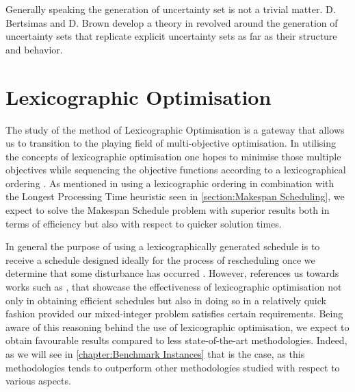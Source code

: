 \vspace{\baselineskip}
\noindent
Generally speaking the generation of uncertainty set is not a trivial matter. D. Bertsimas and D. Brown develop a theory in \cite{concstructuncertaity} revolved around the generation of uncertainty sets that replicate explicit uncertainty sets as far as their structure and behavior. 

\section{Lexicographic Optimisation}
\label{section: Lexicographic}
The study of the method of Lexicographic Optimisation is a gateway that allows us to transition to the playing field of multi-objective optimisation. In utilising the concepts of lexicographic optimisation one hopes to minimise those multiple objectives while sequencing the objective functions according to a lexicographical ordering \cite{surajg}. As mentioned in \cite{DBLP:journals/corr/abs-1805-03437} using a lexicographic ordering in combination with the Longest Processing Time heuristic seen in \ref{section:Makespan Scheduling}, we expect to solve the Makespan Schedule problem with superior results both in terms of efficiency but also with respect to quicker solution times. 

\vspace{\baselineskip}
\noindent
In general the purpose of using a lexicographically generated schedule is to receive a schedule designed ideally for the process of rescheduling once we determine that some disturbance has occurred \cite{liebchen}. However, \cite{DBLP:journals/corr/abs-1805-03437} references us towards works such as \cite{easybylexico},\cite{GUPTE2016150} that showcase the effectiveness of lexicographic optimisation not only in obtaining efficient schedules but also in doing so in a relatively quick fashion provided our mixed-integer problem satisfies certain requirements. Being aware of this reasoning behind the use of lexicographic optimisation, we expect to obtain favourable results compared to less state-of-the-art methodologies. Indeed, as we will see in \ref{chapter:Benchmark Instances} that is the case, as this methodologies tends to outperform other methodologies studied with respect to various aspects.
 



